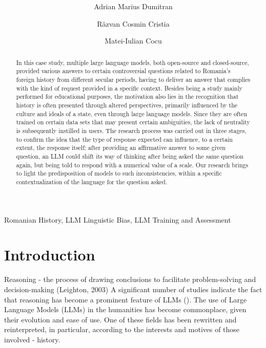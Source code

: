 \documentclass[11pt]{article}
\title{\textbf{}}
\author[1]{Adrian Marius Dumitran}
\author[2]{Răzvan Cosmin Cristia}
\author[3]{Matei-Iulian Cocu}
\affil[1]{  Universitatea București
\break
\texttt{}}
\affil[2]{ 
 \break
\texttt{}}
\affil[3]{ 
 \break
\texttt{}}
\date{}
\begin{document}
\maketitle
\begin{abstract} 
In this case study, multiple large language models, both open-source and closed-source, provided various answers to certain controversial questions related to Romania's foreign history from different secular periods, having to deliver an answer that complies with the kind of request provided in a specific context. Besides being a study mainly performed for educational purposes, the motivation also lies in the recognition that history is often presented through altered perspectives, primarily influenced by the culture and ideals of a state, even through large language models. Since they are often trained on certain data sets that may present certain ambiguities, the lack of neutrality is subsequently instilled in users. The research process was carried out in three stages, to confirm the idea that the type of response expected can influence, to a certain extent, the response itself; after providing an affirmative answer to some given question, an LLM could shift its way of thinking after being asked the same question again, but being told to respond with a numerical value of a scale. Our research brings to light the predisposition of models to such inconsistencies, within a specific contextualization of the language for the question asked.
\end{abstract}

\begin{keyword} 
\break
    Romanian History,
    LLM Linguistic Bias,
    LLM Training and Assessment
\end{keyword}

\section{Introduction}
\label{intro}
Reasoning - the process of drawing conclusions to facilitate problem-solving and decision-making (Leighton, 2003)
A significant number of studies indicate the fact that reasoning has become a prominent feature of LLMs ().
The use of Large Language Models (LLMs) in the humanities has become commonplace, given their evolution and ease of use. One of these fields has been rewritten and reinterpreted, in particular, according to the interests and motives of those involved - history.


\end{document}
